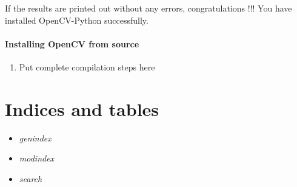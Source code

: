\documentclass[letterpaper,10pt,english]{sphinxmanual}
\begin{document}
If the results are printed out without any errors, congratulations !!! You have installed OpenCV-Python successfully.


\subsubsection{Installing OpenCV from source}
\label{py_tutorials/py_setup/py_setup_in_fedora/py_setup_in_fedora:installing-opencv-from-source}\begin{enumerate}
\item {} 
Put complete compilation steps here

\end{enumerate}


\chapter{Indices and tables}
\label{index:indices-and-tables}\label{index::doc}\begin{itemize}
\item {} 
\emph{genindex}

\item {} 
\emph{modindex}

\item {} 
\emph{search}

\end{itemize}

\begin{thebibliography}{Szeliski}
\end{thebibliography}



\renewcommand{\indexname}{Index}
\printindex
\end{document}
